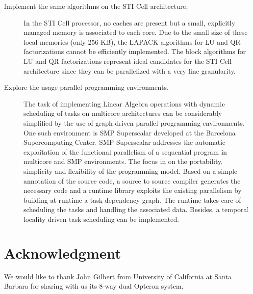 \documentclass[runningheads]{llncs}
\begin{document}
\begin{description}
\item[Implement the same algorithms on the STI Cell architecture.] In
  the STI Cell processor, no caches are present but a small,
  explicitly managed memory is associated to each core. Due to the
  small size of these local memories (only 256 KB), the LAPACK
  algorithms for LU and QR factorizations cannot be efficiently
  implemented. The block algorithms for LU and QR factorizations
  represent ideal candidates for the STI Cell architecture since they
  can be parallelized with a very fine granularity.

\item[Explore the usage parallel programming environments.]  The task of
  implementing Linear Algebra operations with
  dynamic scheduling of tasks on multicore architectures can be
  considerably simplified by the use of graph driven parallel
  programming environments. One such environment is SMP Superscalar\cite{smpss}
  developed at the Barcelona Supercomputing Center. SMP
  Superscalar addresses the automatic exploitation of the functional
  parallelism of a sequential program in multicore and SMP
  environments. The focus in on the portability, simplicity and
  flexibility of the programming model. Based on a simple annotation
  of the source code, a source to source compiler generates the
  necessary code and a runtime library exploits the existing
  parallelism by building at runtime a task dependency graph. The
  runtime takes care of scheduling the tasks and handling the
  associated data. Besides, a temporal locality driven task scheduling
  can be implemented.

\end{description}

\section*{Acknowledgment}
We would like to thank John Gilbert from University of California at Santa Barbara
for sharing with us its 8-way dual Opteron system.



\end{document}
